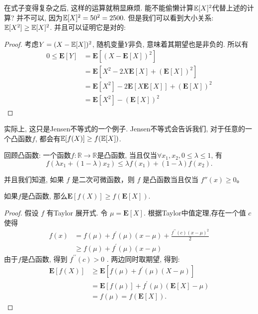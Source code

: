 在式子变得复杂之后, 这样的运算就稍显麻烦. 能不能偷懒计算$\mathbb E[X]^2$代替上述的计算? 并不可以, 因为$\mathbb E[X]^2=50^2=2500.$ 但是我们可以看到大小关系: $\mathbb E[X^2]\geq \mathbb E[X]^2$. 并且可以证明它是对的: 
\begin{proof}
    考虑$Y=(X-\mathbb E[X])^2$, 随机变量$Y$非负, 意味着其期望也是非负的. 所以有
    $$
\begin{aligned}
0 \leq \mathbf{E}[Y] & =\mathbf{E}\left[(X-\mathbf{E}[X])^2\right] \\
& =\mathbf{E}\left[X^2-2 X \mathbf{E}[X]+(\mathbf{E}[X])^2\right] \\
& =\mathbf{E}\left[X^2\right]-2 \mathbf{E}[X \mathbf{E}[X]]+(\mathbf{E}[X])^2 \\
& =\mathbf{E}\left[X^2\right]-(\mathbf{E}[X])^2
\end{aligned}
$$
\end{proof}

实际上, 这只是Jensen不等式的一个例子. Jensen不等式会告诉我们, 对于任意的一个凸函数$f$, 都会有$\mathbb E[f(X)]\geq f(\mathbb E[X])$. 

\begin{asidebox}
回顾凸函数: 一个函数$f:\mathbb R \to \mathbb R$是凸函数, 当且仅当$\forall x_1, x_2, 0\leq \lambda \leq 1$, 有$$
f\left(\lambda x_1+(1-\lambda) x_2\right) \leq \lambda f\left(x_1\right)+(1-\lambda) f\left(x_2\right) .
$$

并且我们知道, 如果 $f$ 是二次可微函数，则 $f$ 是凸函数当且仅当 $f''(x)\geq 0$。
\end{asidebox}

\begin{theorem}
    如果$f$是凸函数, 那么$\mathbf{E}[f(X)] \geq f(\mathbf{E}[X])$. 
\end{theorem}

\begin{proof}
    假设 $f$ 有Taylor 展开式. 令 $\mu=\mathbf{E}[X]$. 根据Taylor中值定理,存在一个值 $c$ 使得
$$
\begin{aligned}
f(x) & =f(\mu)+f^{\prime}(\mu)(x-\mu)+\frac{f^{\prime \prime}(c)(x-\mu)^2}{2} \\
& \geq f(\mu)+f^{\prime}(\mu)(x-\mu)
\end{aligned}
$$
由于$f$是凸函数, 得到 $f^{\prime \prime}(c)>0$ . 两边同时取期望, 得到: 
$$
\begin{aligned}
\mathbf{E}[f(X)] & \geq \mathbf{E}\left[f(\mu)+f^{\prime}(\mu)(X-\mu)\right] \\
& =\mathbf{E}[f(\mu)]+f^{\prime}(\mu)(\mathbf{E}[X]-\mu) \\
& =f(\mu)=f(\mathbf{E}[X]) .
\end{aligned}
$$
\end{proof}

